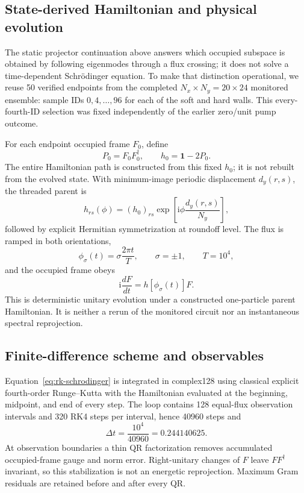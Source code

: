 \documentclass[aps,prb,twocolumn,floatfix,nofootinbib,superscriptaddress]{revtex4-2}
\newcommand{\ii}{\mathrm{i}}
\begin{document}
\subsection{State-derived Hamiltonian and physical evolution}

The static projector continuation above answers which occupied subspace is
obtained by following eigenmodes through a flux crossing; it does not solve a
time-dependent Schr\"odinger equation.  To make that distinction operational,
we reuse 50 verified endpoints from the completed
$N_x\times N_y=20\times24$ monitored ensemble: sample IDs
$0,4,\ldots,96$ for each of the soft and hard walls.  This every-fourth-ID
selection was fixed independently of the earlier zero/unit pump outcome.

For each endpoint occupied frame $F_0$, define
\begin{equation}
 P_0=F_0F_0^\dagger,
 \qquad h_0=\mathbf{1}-2P_0.
 \label{eq:rk-parent}
\end{equation}
The entire Hamiltonian path is constructed from this fixed $h_0$; it is not
rebuilt from the evolved state.  With minimum-image periodic displacement
$d_y(r,s)$, the threaded parent is
\begin{equation}
 h_{rs}(\phi)=
 (h_0)_{rs}\exp\!\left[\ii\phi\frac{d_y(r,s)}{N_y}\right],
 \label{eq:rk-twist}
\end{equation}
followed by explicit Hermitian symmetrization at roundoff level.  The flux is
ramped in both orientations,
\begin{equation}
 \phi_\sigma(t)=\sigma\frac{2\pi t}{T},
 \qquad \sigma=\pm1,\qquad T=10^4,
 \label{eq:rk-schedule}
\end{equation}
and the occupied frame obeys
\begin{equation}
 \ii\frac{dF}{dt}=h[\phi_\sigma(t)]F.
 \label{eq:rk-schrodinger}
\end{equation}
This is deterministic unitary evolution under a constructed one-particle
parent Hamiltonian.  It is neither a rerun of the monitored circuit nor an
instantaneous spectral reprojection.

\subsection{Finite-difference scheme and observables}

Equation~\eqref{eq:rk-schrodinger} is integrated in complex128 using classical
explicit fourth-order Runge--Kutta with the Hamiltonian evaluated at the
beginning, midpoint, and end of every step.  The loop contains 128 equal-flux
observation intervals and 320 RK4 steps per interval, hence 40960 steps and
\begin{equation}
 \Delta t=\frac{10^4}{40960}=0.244140625.
\end{equation}
At observation boundaries a thin QR factorization removes accumulated
occupied-frame gauge and norm error.  Right-unitary changes of $F$ leave
$FF^\dagger$ invariant, so this stabilization is not an energetic
reprojection.  Maximum Gram residuals are retained before and after every QR.
\end{document}
